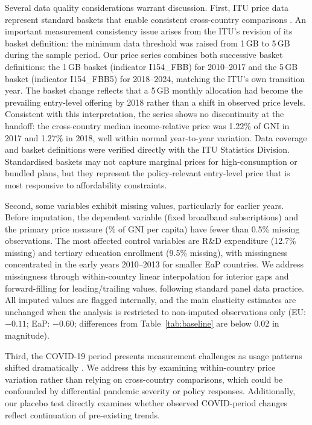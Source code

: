 Several data quality considerations warrant discussion. First, ITU price data represent
standard baskets that enable consistent cross-country comparisons \citep{itu2024data}.
An important measurement consistency issue arises from the ITU's revision of its basket
definition: the minimum data threshold was raised from 1\,GB to 5\,GB during the sample
period. Our price series combines both successive basket definitions: the 1\,GB basket (indicator I154\_FBB) for 2010--2017 and the 5\,GB basket (indicator I154\_FBB5) for 2018--2024, matching the ITU's own transition year. The basket change reflects that a 5\,GB monthly allocation had become the prevailing entry-level offering by 2018 rather than a shift in observed price levels. Consistent with this interpretation, the series shows no discontinuity at the handoff: the cross-country median income-relative price was 1.22\% of GNI in 2017 and 1.27\% in 2018, well within normal year-to-year variation. Data coverage and basket definitions were
verified directly with the ITU Statistics Division. Standardised baskets may not
capture marginal prices for high-consumption or bundled plans, but they represent the
policy-relevant entry-level price that is most responsive to affordability constraints.

Second, some variables exhibit missing values, particularly for earlier years.
Before imputation, the dependent variable (fixed broadband subscriptions) and the
primary price measure (\% of GNI per capita) have fewer than 0.5\% missing observations.
The most affected control variables are R\&D expenditure (12.7\% missing) and tertiary
education enrollment (9.5\% missing), with missingness concentrated in the early years
2010--2013 for smaller EaP countries. We address missingness through within-country linear interpolation
for interior gaps and forward-filling for leading/trailing values, following
standard panel data practice. All imputed values are flagged internally, and the
main elasticity estimates are unchanged when the analysis is restricted to non-imputed
observations only (EU: $-0.11$; EaP: $-0.60$; differences from Table~\ref{tab:baseline}
are below 0.02 in magnitude).

Third, the COVID-19 period presents measurement challenges as usage patterns shifted dramatically \citep{oecd2021covid}. We address this by examining within-country price variation rather than relying on cross-country comparisons, which could be confounded by differential pandemic severity or policy responses. Additionally, our placebo test directly examines whether observed COVID-period changes reflect continuation of pre-existing trends.

